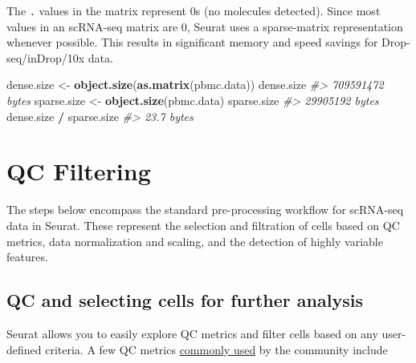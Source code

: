 \documentclass[
]{book}
\newenvironment{Shaded}{\begin{snugshade}}{\end{snugshade}}
\newcommand{\CommentTok}[1]{\textcolor[rgb]{0.56,0.35,0.01}{\textit{#1}}}
\newcommand{\FunctionTok}[1]{\textcolor[rgb]{0.13,0.29,0.53}{\textbf{#1}}}
\newcommand{\NormalTok}[1]{#1}
\newcommand{\OtherTok}[1]{\textcolor[rgb]{0.56,0.35,0.01}{#1}}
\newcommand{\SpecialCharTok}[1]{\textcolor[rgb]{0.81,0.36,0.00}{\textbf{#1}}}
\begin{document}
The \texttt{.} values in the matrix represent 0s (no molecules detected). Since most values in an scRNA-seq matrix are 0, Seurat uses a sparse-matrix representation whenever possible. This results in significant memory and speed savings for Drop-seq/inDrop/10x data.

\begin{Shaded}
\begin{Highlighting}[]
\NormalTok{dense.size }\OtherTok{\textless{}{-}} \FunctionTok{object.size}\NormalTok{(}\FunctionTok{as.matrix}\NormalTok{(pbmc.data))}
\NormalTok{dense.size}
\CommentTok{\#\textgreater{} 709591472 bytes}
\NormalTok{sparse.size }\OtherTok{\textless{}{-}} \FunctionTok{object.size}\NormalTok{(pbmc.data)}
\NormalTok{sparse.size}
\CommentTok{\#\textgreater{} 29905192 bytes}
\NormalTok{dense.size }\SpecialCharTok{/}\NormalTok{ sparse.size}
\CommentTok{\#\textgreater{} 23.7 bytes}
\end{Highlighting}
\end{Shaded}

\hypertarget{qc}{%
\chapter{QC Filtering}\label{qc}}

The steps below encompass the standard pre-processing workflow for scRNA-seq data in Seurat. These represent the selection and filtration of cells based on QC metrics, data normalization and scaling, and the detection of highly variable features.

\hypertarget{qc-and-selecting-cells-for-further-analysis}{%
\section{QC and selecting cells for further analysis}\label{qc-and-selecting-cells-for-further-analysis}}

Seurat allows you to easily explore QC metrics and filter cells based on any user-defined criteria. A few QC metrics \href{https://www.ncbi.nlm.nih.gov/pmc/articles/PMC4758103/}{commonly used} by the community include
\end{document}
